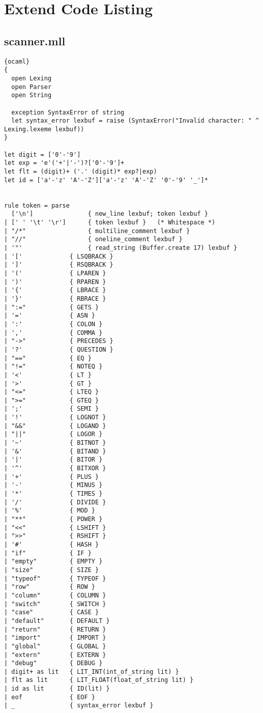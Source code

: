 \chapter{Extend Code Listing}
\section{scanner.mll}
\begin{lstlisting}{ocaml}
{
  open Lexing
  open Parser
  open String

  exception SyntaxError of string
  let syntax_error lexbuf = raise (SyntaxError("Invalid character: " ^ Lexing.lexeme lexbuf))
}

let digit = ['0'-'9']
let exp = 'e'('+'|'-')?['0'-'9']+
let flt = (digit)+ ('.' (digit)* exp?|exp)
let id = ['a'-'z' 'A'-'Z']['a'-'z' 'A'-'Z' '0'-'9' '_']*


rule token = parse
  ['\n']               { new_line lexbuf; token lexbuf }
| [' ' '\t' '\r']      { token lexbuf }   (* Whitespace *)
| "/*"                 { multiline_comment lexbuf }
| "//"                 { oneline_comment lexbuf }
| '"'                  { read_string (Buffer.create 17) lexbuf }
| '['             { LSQBRACK }
| ']'             { RSQBRACK }
| '('             { LPAREN }
| ')'             { RPAREN }
| '{'             { LBRACE }
| '}'             { RBRACE }
| ":="            { GETS }
| '='             { ASN }
| ':'             { COLON }
| ','             { COMMA }
| "->"            { PRECEDES }
| '?'             { QUESTION }
| "=="            { EQ }
| "!="            { NOTEQ }
| '<'             { LT }
| '>'             { GT }
| "<="            { LTEQ }
| ">="            { GTEQ }
| ';'             { SEMI }
| '!'             { LOGNOT }
| "&&"            { LOGAND }
| "||"            { LOGOR }
| '~'             { BITNOT }
| '&'             { BITAND }
| '|'             { BITOR }
| '^'             { BITXOR }
| '+'             { PLUS }
| '-'             { MINUS }
| '*'             { TIMES }
| '/'             { DIVIDE }
| '%'             { MOD }
| "**"            { POWER }
| "<<"            { LSHIFT }
| ">>"            { RSHIFT }
| '#'             { HASH }
| "if"            { IF }
| "empty"         { EMPTY }
| "size"          { SIZE }
| "typeof"        { TYPEOF }
| "row"           { ROW }
| "column"        { COLUMN }
| "switch"        { SWITCH }
| "case"          { CASE }
| "default"       { DEFAULT }
| "return"        { RETURN }
| "import"        { IMPORT }
| "global"        { GLOBAL }
| "extern"        { EXTERN }
| "debug"         { DEBUG }
| digit+ as lit   { LIT_INT(int_of_string lit) }
| flt as lit      { LIT_FLOAT(float_of_string lit) }
| id as lit       { ID(lit) }
| eof             { EOF }
| _               { syntax_error lexbuf }


\end{lstlisting}

